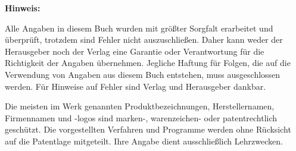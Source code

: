\textbf{Hinweis:}

Alle Angaben in diesem Buch wurden mit größter Sorgfalt erarbeitet und überprüft, trotzdem sind Fehler nicht auszuschließen. Daher kann weder der Herausgeber noch der Verlag eine Garantie oder Verantwortung für die Richtigkeit der Angaben übernehmen. Jegliche Haftung für Folgen, die auf die Verwendung von Angaben aus diesem Buch entstehen, muss ausgeschlossen werden. Für Hinweise auf Fehler sind Verlag und Herausgeber dankbar.

Die meisten im Werk genannten Produktbezeichnungen, Herstellernamen, Firmennamen und -logos sind marken-, warenzeichen- oder patentrechtlich geschützt. Die vorgestellten Verfahren und Programme werden ohne Rücksicht auf die Patentlage mitgeteilt. Ihre Angabe dient ausschließlich Lehrzwecken.


